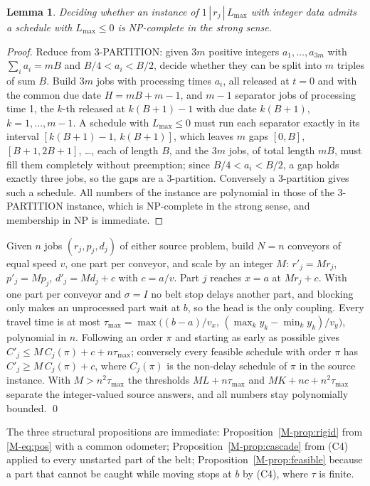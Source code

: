 \documentclass[11pt,a4paper]{article}
\theoremstyle{plain}
\newtheorem{lemma}{Lemma}
\theoremstyle{definition}
\theoremstyle{remark}
\begin{document}
\begin{lemma}\label{lem:lmax}
Deciding whether an instance of $1\,|\,r_j\,|\,L_{\max}$ with integer data admits a
schedule with $L_{\max}\le0$ is NP-complete in the strong sense.
\end{lemma}
\begin{proof}
Reduce from 3-PARTITION: given $3m$ positive integers $a_1,\dots,a_{3m}$ with
$\sum_ia_i=mB$ and $B/4<a_i<B/2$, decide whether they can be split into $m$ triples of
sum $B$. Build $3m$ jobs with processing times $a_i$, all released at $t=0$ and with
the common due date $H=mB+m-1$, and $m-1$ separator jobs of processing time 1, the
$k$-th released at $k(B+1)-1$ with due date $k(B+1)$, $k=1,\dots,m-1$. A schedule with
$L_{\max}\le0$ must run each separator exactly in its interval
$[k(B+1)-1,\,k(B+1)]$, which leaves $m$ gaps $[0,B]$, $[B+1,2B+1]$, \dots, each of length
$B$, and the $3m$ jobs, of total length $mB$, must fill them completely without
preemption; since $B/4<a_i<B/2$, a gap holds exactly three jobs, so the gaps are a
3-partition. Conversely a 3-partition gives such a schedule. All numbers of the
instance are polynomial in those of the 3-PARTITION instance, which is NP-complete in
the strong sense, and membership in NP is immediate.
\end{proof}

Given $n$ jobs $(r_j,p_j,d_j)$ of either source problem, build $N=n$ conveyors of
equal speed $v$, one part per conveyor, and scale by an integer $M$: $r'_j=Mr_j$,
$p'_j=Mp_j$, $d'_j=Md_j+c$ with $c=a/v$. Part $j$ reaches $x=a$ at $Mr_j+c$. With one part
per conveyor and $\sigma=I$ no belt stop delays another part, and blocking only makes an
unprocessed part wait at $b$, so the head is the only coupling. Every travel time is at
most $\tau_{\max}=\max\bigl((b-a)/v_x,\,(\max_ky_k-\min_ky_k)/v_y\bigr)$, polynomial in
$n$. Following an order $\pi$ and starting as early as possible gives
$C'_j\le M\,C_j(\pi)+c+n\tau_{\max}$; conversely every feasible schedule with order $\pi$
has $C'_j\ge M\,C_j(\pi)+c$, where $C_j(\pi)$ is the non-delay schedule of $\pi$ in the
source instance. With $M>n^2\tau_{\max}$ the thresholds $ML+n\tau_{\max}$ and
$MK+nc+n^2\tau_{\max}$ separate the integer-valued source answers, and all numbers stay
polynomially bounded. \qed

The three structural propositions are immediate: Proposition~\ref{M-prop:rigid} from
\eqref{M-eq:pos} with a common odometer; Proposition~\ref{M-prop:cascade} from (C4) applied to
every unstarted part of the belt; Proposition~\ref{M-prop:feasible} because a part that
cannot be caught while moving stops at $b$ by (C4), where $\tau$ is finite.
\end{document}

